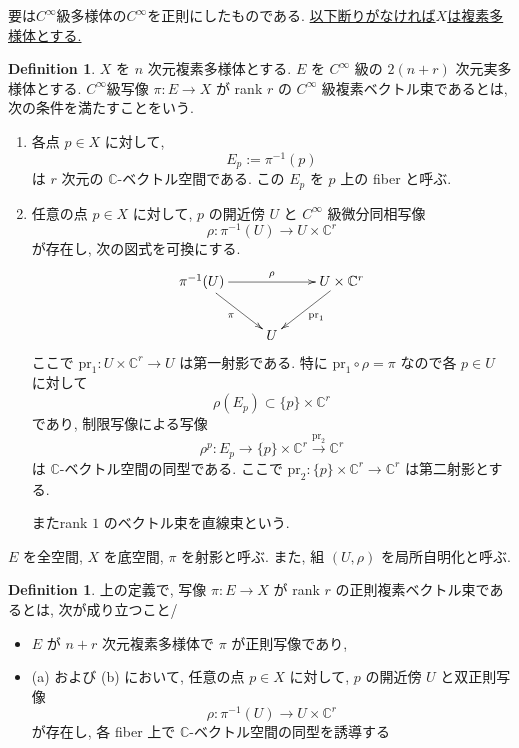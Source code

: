 \documentclass[dvipdfmx,a4paper,11pt]{article} %
\theoremstyle{definition}
\newtheorem{defn}[thm]{Definition}
\theoremstyle{remark}
\numberwithin{equation}{section}
\begin{document}
要は$C^\infty$級多様体の$C^\infty$を正則にしたものである. 
\underline{以下断りがなければ$X$は複素多様体とする. }
\begin{defn}
\(X\) を \(n\) 次元複素多様体とする. \(E\) を \(C^\infty\) 級の \(2(n+r)\) 次元実多様体とする. $C^\infty$級写像 \(\pi\colon E\longrightarrow X\) が rank \(r\) の \(C^\infty\) 級複素ベクトル束であるとは, 次の条件を満たすことをいう.
\begin{enumerate}
\item[(a)] 各点 \(p\in X\) に対して,
\[
E_p:=\pi^{-1}(p)
\]
は \(r\) 次元の \(\mathbb{C}\)-ベクトル空間である. この \(E_p\) を \(p\) 上の fiber と呼ぶ.
\item[(b)] 任意の点 \(p\in X\) に対して, \(p\) の開近傍 \(U\) と \(C^\infty\) 級微分同相写像
\[
\rho\colon \pi^{-1}(U)\longrightarrow U\times \mathbb{C}^r
\]
が存在し, 次の図式を可換にする.
\[
\xymatrix{
\pi^{-1}(U) \ar[rr]^{\rho} \ar[dr]_{\pi} && U\times \mathbb{C}^r \ar[dl]^{\mathrm{pr}_1} \\
& U &
}
\]
ここで \(\mathrm{pr}_1\colon U\times \mathbb{C}^r\to U\) は第一射影である. 
特に
\(
\mathrm{pr}_1\circ \rho=\pi
\)
 なので各 \(p\in U\) に対して 
 \[
\rho(E_p) \subset \{p\}\times \mathbb{C}^r\]
であり, 制限写像による写像
\[
\rho^p\colon E_p\longrightarrow \{p\}\times \mathbb{C}^r \overset{\mathrm{pr}_2}{\longrightarrow} \mathbb{C}^r
\]
は \(\mathbb{C}\)-ベクトル空間の同型である. 
ここで \(\mathrm{pr}_2\colon \{p\}\times \mathbb{C}^r\to \mathbb{C}^r\) は第二射影とする.

またrank \(1\) のベクトル束を直線束という.
\end{enumerate}
\(E\) を全空間, \(X\) を底空間, \(\pi\) を射影と呼ぶ. また, 組 \((U,\rho)\) を局所自明化と呼ぶ.
\end{defn}
\begin{defn}
上の定義で, 写像 \(\pi\colon E\longrightarrow X\) が rank \(r\) の正則複素ベクトル束であるとは, 次が成り立つこと/
\begin{itemize}
\item \(E\) が \(n+r\) 次元複素多様体で \(\pi\) が正則写像であり, 
\item (a) および (b) において, 任意の点 \(p\in X\) に対して, \(p\) の開近傍 \(U\) と双正則写像
\[
\rho\colon \pi^{-1}(U)\longrightarrow U\times \mathbb{C}^r
\]
が存在し, 各 fiber 上で \(\mathbb{C}\)-ベクトル空間の同型を誘導する
\end{itemize}

\end{defn}
\end{document}
